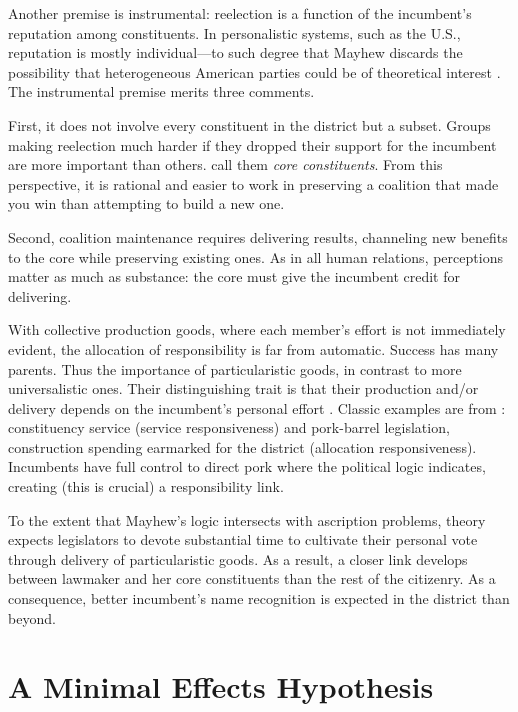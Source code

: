 \documentclass[letter,12pt]{article}
\begin{document}
Another premise is instrumental: reelection is a function of the incumbent's reputation among constituents. In personalistic systems, such as the U.S., reputation is mostly individual---to such degree that Mayhew discards the possibility that heterogeneous American parties could be of theoretical interest \citep[but revisionists rescued party relevance in Mayhew's framework,][]{cox.mccubbins.2007leviath2nd,aldrich.1995}. The instrumental premise merits three comments. 

First, it does not involve every constituent in the district but a subset. Groups making reelection much harder if they dropped their support for the incumbent are more important than others. \citet{cox.mccubbins.1986} call them \emph{core constituents}. From this perspective, it is rational and easier to work in preserving a coalition that made you win than attempting to build a new one.

Second, coalition maintenance requires delivering results, channeling new benefits to the core while preserving existing ones. As in all human relations, perceptions matter as much as substance: the core must give the incumbent credit for delivering. 

With collective production goods, where each member's effort is not immediately evident, the allocation of responsibility is far from automatic. Success has many parents. Thus the importance of particularistic goods, in contrast to more universalistic ones. Their distinguishing trait is that their production and/or delivery depends on the incumbent's personal effort \citep{haggard.mccubbins.2001}. Classic examples are from \citet{cain.etal.1987}: constituency service (service responsiveness) and pork-barrel legislation, construction spending earmarked for the district (allocation responsiveness). Incumbents have full control to direct pork where the political logic indicates, creating (this is crucial) a responsibility link.

To the extent that Mayhew's logic intersects with ascription problems, theory expects legislators to devote substantial time to cultivate their personal vote through delivery of particularistic goods. As a result, a closer link develops between lawmaker and her core constituents than the rest of the citizenry. As a consequence, better incumbent's name recognition is expected in the district than beyond. 

\section{A Minimal Effects Hypothesis}
\end{document}
